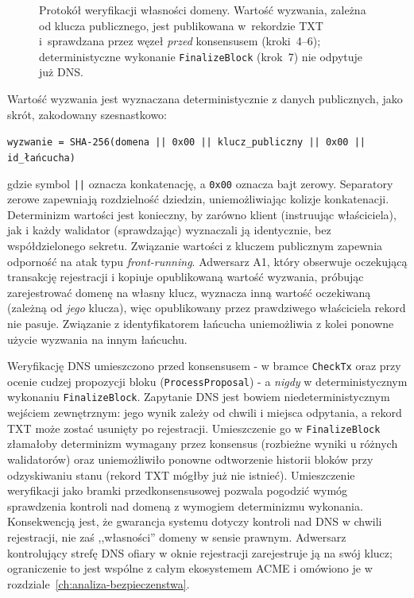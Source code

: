 \begin{figure}[htbp]
    \caption{Protokół weryfikacji własności domeny. Wartość wyzwania, zależna od klucza publicznego, jest publikowana w~rekordzie TXT i~sprawdzana przez węzeł \emph{przed} konsensusem (kroki~4--6); deterministyczne wykonanie \texttt{FinalizeBlock} (krok~7) nie odpytuje już DNS.}
    \label{fig:weryfikacja-domeny}
\end{figure}

Wartość wyzwania jest wyznaczana deterministycznie z danych publicznych, jako skrót, zakodowany szesnastkowo:

\begin{center}
    \texttt{wyzwanie = SHA-256(domena || 0x00 || klucz\_publiczny || 0x00 || id\_łańcucha)}
\end{center}

\noindent gdzie symbol \texttt{||} oznacza konkatenację, a \texttt{0x00} oznacza bajt zerowy. Separatory zerowe zapewniają rozdzielność dziedzin, uniemożliwiając kolizje konkatenacji. Determinizm wartości jest konieczny, by zarówno klient (instruując właściciela), jak i każdy walidator (sprawdzając) wyznaczali ją identycznie, bez współdzielonego sekretu. Związanie wartości z kluczem publicznym zapewnia odporność na atak typu \emph{front-running}. Adwersarz A1, który obserwuje oczekującą transakcję rejestracji i kopiuje opublikowaną wartość wyzwania, próbując zarejestrować domenę na własny klucz, wyznacza inną wartość oczekiwaną (zależną od \emph{jego} klucza), więc opublikowany przez prawdziwego właściciela rekord nie pasuje. Związanie z identyfikatorem łańcucha uniemożliwia z kolei ponowne użycie wyzwania na innym łańcuchu.

Weryfikację DNS umieszczono przed konsensusem - w bramce \texttt{CheckTx} oraz przy ocenie cudzej propozycji bloku (\texttt{ProcessProposal}) - a \emph{nigdy} w deterministycznym wykonaniu \texttt{FinalizeBlock}. Zapytanie DNS jest bowiem niedeterministycznym wejściem zewnętrznym: jego wynik zależy od chwili i miejsca odpytania, a rekord TXT może zostać usunięty po rejestracji. Umieszczenie go w \texttt{FinalizeBlock} złamałoby determinizm wymagany przez konsensus (rozbieżne wyniki u różnych walidatorów) oraz uniemożliwiło ponowne odtworzenie historii bloków przy odzyskiwaniu stanu (rekord TXT mógłby już nie istnieć). Umieszczenie weryfikacji jako bramki przedkonsensusowej pozwala pogodzić wymóg sprawdzenia kontroli nad domeną z wymogiem determinizmu wykonania. Konsekwencją jest, że gwarancja systemu dotyczy kontroli nad DNS w chwili rejestracji, nie zaś ,,własności'' domeny w sensie prawnym. Adwersarz kontrolujący strefę DNS ofiary w oknie rejestracji zarejestruje ją na swój klucz; ograniczenie to jest wspólne z całym ekosystemem ACME i omówiono je w rozdziale~\ref{ch:analiza-bezpieczenstwa}.

